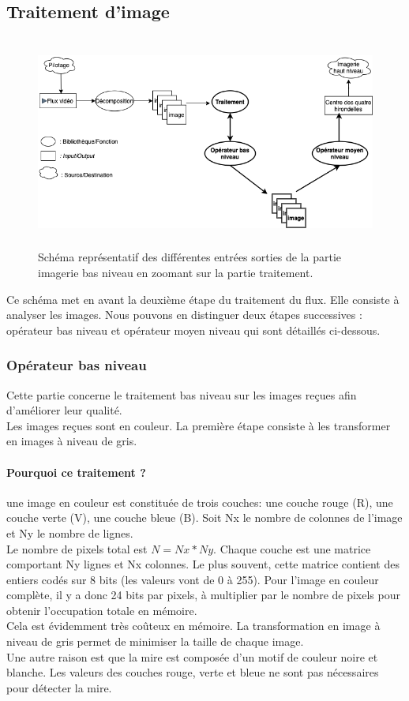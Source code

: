 \documentclass[12pt]{article}
\begin{document}
\subsection{Traitement d'image}
\label{section:Traitement}

 \begin{figure}[H]
\centering
\includegraphics[height=7cm]{workflowI.png}
\caption{Schéma représentatif des différentes entrées sorties de la partie imagerie bas niveau en zoomant sur la partie traitement. }
\label{fig:WorkflowI}
\end{figure}

Ce schéma met en avant la deuxième étape du traitement du flux. Elle consiste à analyser les images.
Nous pouvons en distinguer deux étapes successives : opérateur bas niveau et opérateur moyen niveau qui sont détaillés ci-dessous.

\subsubsection{Opérateur bas niveau }
Cette partie concerne le traitement bas niveau sur les images reçues afin d'améliorer leur qualité.\\
Les images reçues sont en couleur. La première étape consiste à les transformer en images à niveau de gris.

\paragraph*{\textbf{Pourquoi ce traitement ?}} une image en couleur est constituée de trois couches: une couche rouge (R), une couche verte (V), une couche bleue (B). Soit Nx le nombre de colonnes de l'image et Ny le nombre de lignes.\\ Le nombre de pixels total est $N=Nx * Ny$. Chaque couche est une matrice comportant Ny lignes et Nx colonnes. Le plus souvent, cette matrice contient des entiers codés sur 8 bits (les valeurs vont de 0 à 255). Pour l'image en couleur complète, il y a donc 24 bits par pixels, à multiplier par le nombre de pixels pour obtenir l'occupation totale en mémoire.\\
Cela est évidemment très coûteux en mémoire. La transformation en image à niveau de gris permet de minimiser la taille de chaque image.\\ Une autre raison est que la mire est composée d'un motif de couleur noire et blanche. Les valeurs des couches rouge, verte et bleue ne sont pas nécessaires pour détecter la mire.   
\end{document}
